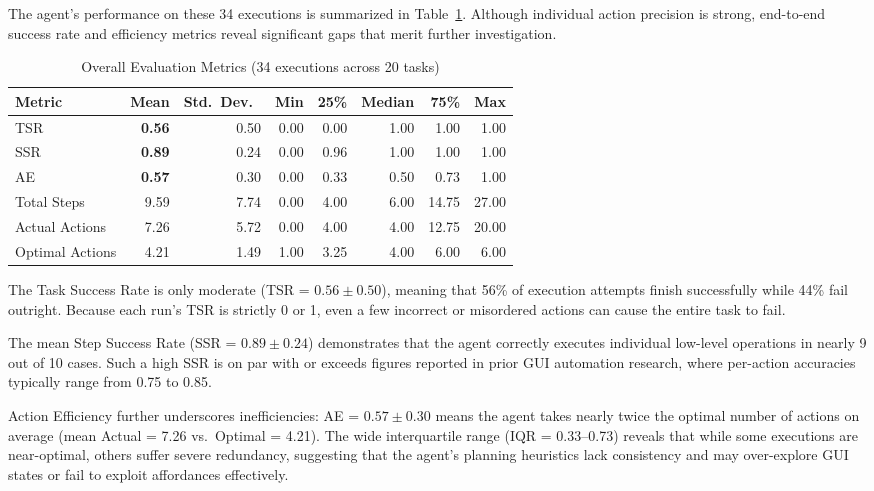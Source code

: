\documentclass[runningheads]{llncs}
\begin{document}
The agent’s performance on these 34 executions is summarized in Table~\ref{tab:overall_eval}. Although individual action precision is strong, end-to-end success rate and efficiency metrics reveal significant gaps that merit further investigation.

\begin{table}[H]
\centering
\caption{Overall Evaluation Metrics (34 executions across 20 tasks)}
\label{tab:overall_eval}
\renewcommand{\arraystretch}{1.2}
\setlength{\tabcolsep}{8pt}
\begin{tabular}{lrrrrrrr}
\toprule
Metric           & \textbf{Mean} & Std.\ Dev.\ & Min  & 25\%   & Median & 75\%    & Max  \\
\midrule
TSR              & \textbf{0.56} & 0.50        & 0.00 & 0.00   & 1.00   & 1.00    & 1.00 \\
SSR              & \textbf{0.89} & 0.24        & 0.00 & 0.96   & 1.00   & 1.00    & 1.00 \\
AE               & \textbf{0.57} & 0.30        & 0.00 & 0.33   & 0.50   & 0.73    & 1.00 \\
Total Steps      & 9.59          & 7.74        & 0.00 & 4.00   & 6.00   & 14.75   & 27.00\\
Actual Actions   & 7.26          & 5.72        & 0.00 & 4.00   & 4.00   & 12.75   & 20.00\\
Optimal Actions  & 4.21          & 1.49        & 1.00 & 3.25   & 4.00   & 6.00    & 6.00 \\
\bottomrule
\end{tabular}
\end{table}

The Task Success Rate is only moderate (TSR = \(\mathbf{0.56}\pm0.50\)), meaning that 56\% of execution attempts finish successfully while 44\% fail outright. Because each run’s TSR is strictly 0 or 1, even a few incorrect or misordered actions can cause the entire task to fail.  

The mean Step Success Rate (SSR = \(\mathbf{0.89}\pm0.24\)) demonstrates that the agent correctly executes individual low-level operations in nearly 9 out of 10 cases. Such a high SSR is on par with or exceeds figures reported in prior GUI automation research, where per-action accuracies typically range from 0.75 to 0.85.

Action Efficiency further underscores inefficiencies: AE = \(\mathbf{0.57}\pm0.30\) means the agent takes nearly twice the optimal number of actions on average (mean Actual = 7.26 vs.\ Optimal = 4.21). The wide interquartile range (IQR = 0.33–0.73) reveals that while some executions are near-optimal, others suffer severe redundancy, suggesting that the agent’s planning heuristics lack consistency and may over-explore GUI states or fail to exploit affordances effectively.
\end{document}
